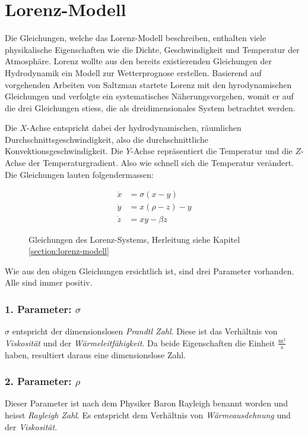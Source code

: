 

\section{Lorenz-Modell}\label{lorenz-modell}
Die Gleichungen, welche das Lorenz-Modell beschreiben, enthalten viele physikalische Eigenschaften wie die Dichte, Geschwindigkeit und Temperatur der Atmosphäre. Lorenz wollte aus den bereits existierenden Gleichungen der Hydrodynamik ein Modell zur Wetterprognose erstellen. Basierend auf vorgehenden Arbeiten von Saltzman \cite{saltzman62} startete Lorenz mit den hyrodynamischen Gleichungen und verfolgte ein systematisches Näherungsvorgehen, womit er auf die drei Gleichungen stiess, die als dreidimensionales System betrachtet werden. 

Die $X$-Achse entspricht dabei der hydrodynamischen, räumlichen Durchschnittsgeschwindigkeit, also die durchschnittliche Konvektionsgeschwindigkeit. Die $Y$-Achse repräsentiert die Temperatur und die $Z$-Achse der Temperaturgradient. Also wie schnell sich die Temperatur verändert. Die Gleichungen lauten folgendermassen:

\begin{figure}
	\begin{align}
		\dot{x} &= \sigma(x - y)\\
		\dot{y} &= x(\rho - z) - y\\
		\dot{z} &= xy - \beta z
	\end{align}
	\caption{Gleichungen des Lorenz-Systems, Herleitung siehe Kapitel \ref{section:lorenz-modell}}
\end{figure}

Wie aus den obigen Gleichungen ersichtlich ist, sind drei Parameter vorhanden. Alle sind immer positiv.

\subsubsection{1. Parameter: $\sigma$}
$\sigma$ entspricht der dimensionslosen {\em Prandtl Zahl}. Diese ist das Verhältnis von {\em Viskosität} und der {\em Wärmeleitfähigkeit}. Da beide Eigenschaften die Einheit $\frac{\text{m}^2}{\text{s}}$ haben, resultiert daraus eine dimensionslose Zahl.
%
%
%

\subsubsection{2. Parameter: $\rho$}
Dieser Parameter ist nach dem Physiker Baron Rayleigh benannt worden und heisst {\em Rayleigh Zahl}. Es entspricht dem Verhältnis von {\em Wärmeausdehnung} und der {\em Viskosität}.
%

